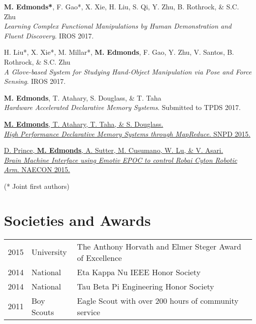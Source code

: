 \documentclass[letterpaper]{deedy-resume} %
\begin{document}
\begin{minipage}[t]{0.66\textwidth}
\textbf{M. Edmonds*}, F. Gao*, X. Xie, H. Liu, S. Qi, Y. Zhu, B. Rothrock, \& S.C. Zhu\\
\textit{Learning Complex Functional Manipulations by Human Demonstration and Fluent Discovery}. IROS 2017.

\vspace{5pt}

H. Liu*, X. Xie*, M. Millar*, \textbf{M. Edmonds}, F. Gao, Y. Zhu, V. Santos, B. Rothrock, \& S.C. Zhu \\
\textit{A Glove-based System for Studying Hand-Object Manipulation via Pose and Force Sensing}. IROS 2017.

\vspace{5pt}

\textbf{M. Edmonds}, T. Atahary, S. Douglass, \& T. Taha\\
\textit{Hardware Accelerated Declarative Memory Systems}. Submitted to TPDS 2017.

\vspace{5pt}

\href{http://ieeexplore.ieee.org/xpl/articleDetails.jsp?arnumber=7176183}
{\textbf{M. Edmonds}, T. Atahary, T. Taha, \& S. Douglass. \\
\textit{High Performance Declarative Memory Systems through MapReduce}. SNPD 2015.
}

\vspace{5pt}

\href{http://ecommons.udayton.edu/cgi/viewcontent.cgi?article=1388&context=ece_fac_pub}
{D. Prince, \textbf{M. Edmonds}, A. Sutter, M. Cusumano, W. Lu, \& V. Asari.\\
\textit{Brain Machine Interface using Emotiv EPOC to control Robai Cyton Robotic Arm}. NAECON 2015.
}


\hfill {\footnotesize (* Joint first authors)}

\sectionspace %


\section{Societies and Awards} 

\begin{tabular}{rll}
2015 & University & The Anthony Horvath and Elmer Steger Award of Excellence \\
2014 & National & Eta Kappa Nu IEEE Honor Society\\
2014 & National & Tau Beta Pi Engineering Honor Society\\
2011 & Boy Scouts & Eagle Scout with over 200 hours of community service\\
\end{tabular}

\sectionspace %


\end{minipage} %
\end{document}
